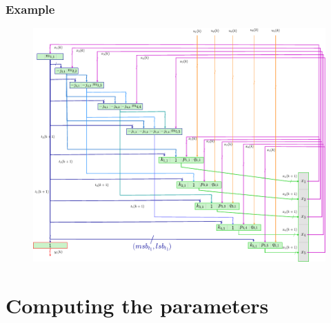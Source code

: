 \begin{frame}
	\frametitle{Example}
	\begin{figure}
		\includegraphics[scale=0.8, trim=5cm 0cm 0cm 5cm,clip]{pictures/exampleGreenScheme.pdf}
	\end{figure}
\end{frame}

\section{Computing the parameters}

